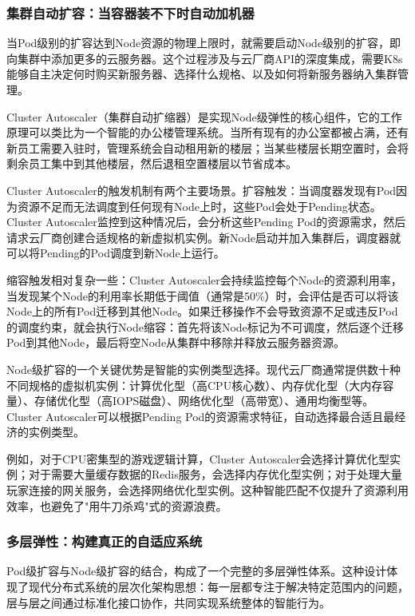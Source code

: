 \subsubsection{集群自动扩容：当容器装不下时自动加机器}

当Pod级别的扩容达到Node资源的物理上限时，就需要启动Node级别的扩容，即向集群中添加更多的云服务器。这个过程涉及与云厂商API的深度集成，需要K8s能够自主决定何时购买新服务器、选择什么规格、以及如何将新服务器纳入集群管理。

Cluster Autoscaler（集群自动扩缩器）是实现Node级弹性的核心组件，它的工作原理可以类比为一个智能的办公楼管理系统。当所有现有的办公室都被占满，还有新员工需要入驻时，管理系统会自动租用新的楼层；当某些楼层长期空置时，会将剩余员工集中到其他楼层，然后退租空置楼层以节省成本。

Cluster Autoscaler的触发机制有两个主要场景。扩容触发：当调度器发现有Pod因为资源不足而无法调度到任何现有Node上时，这些Pod会处于Pending状态。Cluster Autoscaler监控到这种情况后，会分析这些Pending Pod的资源需求，然后请求云厂商创建合适规格的新虚拟机实例。新Node启动并加入集群后，调度器就可以将Pending的Pod调度到新Node上运行。

缩容触发相对复杂一些：Cluster Autoscaler会持续监控每个Node的资源利用率，当发现某个Node的利用率长期低于阈值（通常是50\%）时，会评估是否可以将该Node上的所有Pod迁移到其他Node。如果迁移操作不会导致资源不足或违反Pod的调度约束，就会执行Node缩容：首先将该Node标记为不可调度，然后逐个迁移Pod到其他Node，最后将空Node从集群中移除并释放云服务器资源。

Node级扩容的一个关键优势是智能的实例类型选择。现代云厂商通常提供数十种不同规格的虚拟机实例：计算优化型（高CPU核心数）、内存优化型（大内存容量）、存储优化型（高IOPS磁盘）、网络优化型（高带宽）、通用均衡型等。Cluster Autoscaler可以根据Pending Pod的资源需求特征，自动选择最合适且最经济的实例类型。

例如，对于CPU密集型的游戏逻辑计算，Cluster Autoscaler会选择计算优化型实例；对于需要大量缓存数据的Redis服务，会选择内存优化型实例；对于处理大量玩家连接的网关服务，会选择网络优化型实例。这种智能匹配不仅提升了资源利用效率，也避免了"用牛刀杀鸡"式的资源浪费。

\subsubsection{多层弹性：构建真正的自适应系统}

Pod级扩容与Node级扩容的结合，构成了一个完整的多层弹性体系。这种设计体现了现代分布式系统的层次化架构思想：每一层都专注于解决特定范围内的问题，层与层之间通过标准化接口协作，共同实现系统整体的智能行为。

